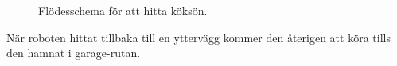 \documentclass[a4paper,11pt]{article}
\begin{document}
\begin{figure}[h!]
    \caption{Flödesschema för att hitta köksön. \label{fig:kitchenDrive}}
\end{figure}

När roboten hittat tillbaka till en yttervägg kommer den återigen att köra tills den hamnat i garage-rutan.
    
\end{document}
